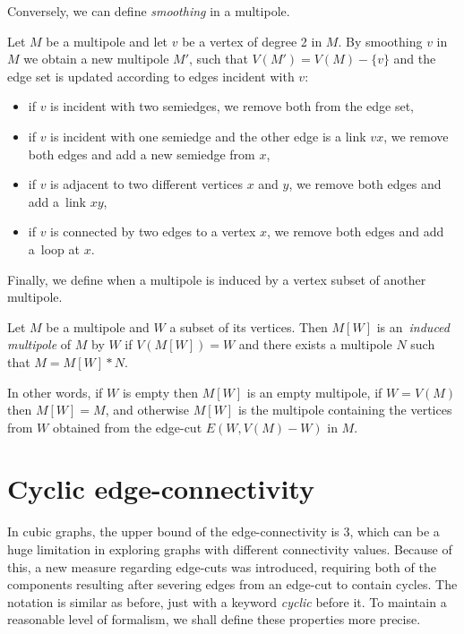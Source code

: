 \documentclass[12pt, twoside]{book}
\begin{document}
Conversely, we can define \textit{smoothing} in a multipole.
\begin{definition}
	Let $M$ be a multipole and let $v$ be a vertex of degree 2 in $M$. By smoothing $v$ in $M$ we obtain a new multipole $M'$, such that $V(M')=V(M)-\{v\}$ and the edge set is updated according to edges incident with $v$:
	\begin{itemize}
		\item if $v$ is incident with two semiedges, we remove both from the edge set,
		\item if $v$ is incident with one semiedge and the other edge is a link $vx$, we remove both edges and add a new semiedge from $x$,
		\item if $v$ is adjacent to two different vertices $x$ and $y$, we remove both edges and add a~link $xy$,
		\item if $v$ is connected by two edges to a vertex $x$, we remove both edges and add a~loop at $x$.
	\end{itemize}
\end{definition}

Finally, we define when a multipole is induced by a vertex subset of another multipole.
\begin{definition}
	Let $M$ be a multipole and $W$ a subset of its vertices. Then $M[W]$ is an~\textit{induced multipole} of $M$ by $W$ if $V(M[W])=W$ and there exists a multipole $N$ such that $M=M[W]*N$.
\end{definition}

In other words, if $W$ is empty then $M[W]$ is an empty multipole, if $W=V(M)$ then $M[W]=M$, and otherwise $M[W]$ is the multipole containing the vertices from $W$ obtained from the edge-cut $E\left(W,V(M)-W\right)$ in $M$.

\section{Cyclic edge-connectivity}\label{sec:cyclic-edge-connectivity}

In cubic graphs, the upper bound of the edge-connectivity is 3, which can be a huge limitation in exploring graphs with different connectivity values. Because of this, a new measure regarding edge-cuts was introduced, requiring both of the components resulting after severing edges from an edge-cut to contain cycles. The notation is similar as before, just with a keyword \textit{cyclic} before it. To maintain a reasonable level of formalism, we shall define these properties more precise.
\end{document}
